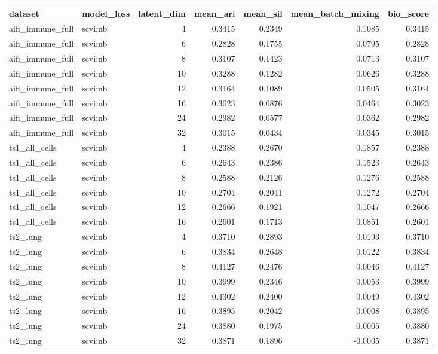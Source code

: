\begin{tabular}{llrrrrr}
\toprule
dataset & model\_loss & latent\_dim & mean\_ari & mean\_sil & mean\_batch\_mixing & bio\_score \\
\midrule
aifi\_immune\_full & scvi:nb & 4 & 0.3415 & 0.2349 & 0.1085 & 0.3415 \\
aifi\_immune\_full & scvi:nb & 6 & 0.2828 & 0.1755 & 0.0795 & 0.2828 \\
aifi\_immune\_full & scvi:nb & 8 & 0.3107 & 0.1423 & 0.0713 & 0.3107 \\
aifi\_immune\_full & scvi:nb & 10 & 0.3288 & 0.1282 & 0.0626 & 0.3288 \\
aifi\_immune\_full & scvi:nb & 12 & 0.3164 & 0.1089 & 0.0505 & 0.3164 \\
aifi\_immune\_full & scvi:nb & 16 & 0.3023 & 0.0876 & 0.0464 & 0.3023 \\
aifi\_immune\_full & scvi:nb & 24 & 0.2982 & 0.0577 & 0.0362 & 0.2982 \\
aifi\_immune\_full & scvi:nb & 32 & 0.3015 & 0.0434 & 0.0345 & 0.3015 \\
ts1\_all\_cells & scvi:nb & 4 & 0.2388 & 0.2670 & 0.1857 & 0.2388 \\
ts1\_all\_cells & scvi:nb & 6 & 0.2643 & 0.2386 & 0.1523 & 0.2643 \\
ts1\_all\_cells & scvi:nb & 8 & 0.2588 & 0.2126 & 0.1276 & 0.2588 \\
ts1\_all\_cells & scvi:nb & 10 & 0.2704 & 0.2041 & 0.1272 & 0.2704 \\
ts1\_all\_cells & scvi:nb & 12 & 0.2666 & 0.1921 & 0.1047 & 0.2666 \\
ts1\_all\_cells & scvi:nb & 16 & 0.2601 & 0.1713 & 0.0851 & 0.2601 \\
ts2\_lung & scvi:nb & 4 & 0.3710 & 0.2893 & 0.0193 & 0.3710 \\
ts2\_lung & scvi:nb & 6 & 0.3834 & 0.2648 & 0.0122 & 0.3834 \\
ts2\_lung & scvi:nb & 8 & 0.4127 & 0.2476 & 0.0046 & 0.4127 \\
ts2\_lung & scvi:nb & 10 & 0.3999 & 0.2346 & 0.0053 & 0.3999 \\
ts2\_lung & scvi:nb & 12 & 0.4302 & 0.2400 & 0.0049 & 0.4302 \\
ts2\_lung & scvi:nb & 16 & 0.3895 & 0.2042 & 0.0008 & 0.3895 \\
ts2\_lung & scvi:nb & 24 & 0.3880 & 0.1975 & 0.0005 & 0.3880 \\
ts2\_lung & scvi:nb & 32 & 0.3871 & 0.1896 & -0.0005 & 0.3871 \\
\bottomrule
\end{tabular}
